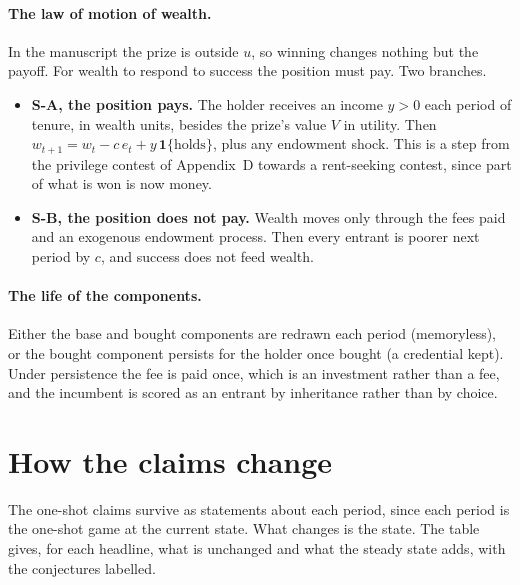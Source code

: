 \documentclass[11pt]{article}
\begin{document}
\paragraph{The law of motion of wealth.} In the manuscript the prize is outside
$u$, so winning changes nothing but the payoff. For wealth to respond to
success the position must pay. Two branches.
\begin{itemize}
\item \textbf{S-A, the position pays.} The holder receives an income $y>0$ each
  period of tenure, in wealth units, besides the prize's value $V$ in utility.
  Then $w_{t+1}=w_t-c\,e_t+y\,\mathbf 1\{\text{holds}\}$, plus any endowment
  shock. This is a step from the privilege contest of Appendix~D towards a
  rent-seeking contest, since part of what is won is now money.
\item \textbf{S-B, the position does not pay.} Wealth moves only through the
  fees paid and an exogenous endowment process. Then every entrant is poorer
  next period by $c$, and success does not feed wealth.
\end{itemize}

\paragraph{The life of the components.} Either the base and bought components
are redrawn each period (memoryless), or the bought component persists for the
holder once bought (a credential kept). Under persistence the fee is paid once,
which is an investment rather than a fee, and the incumbent is scored as an
entrant by inheritance rather than by choice.

\section{How the claims change}

The one-shot claims survive as statements about each period, since each period
is the one-shot game at the current state. What changes is the state. The
table gives, for each headline, what is unchanged and what the steady state
adds, with the conjectures labelled.
\end{document}
